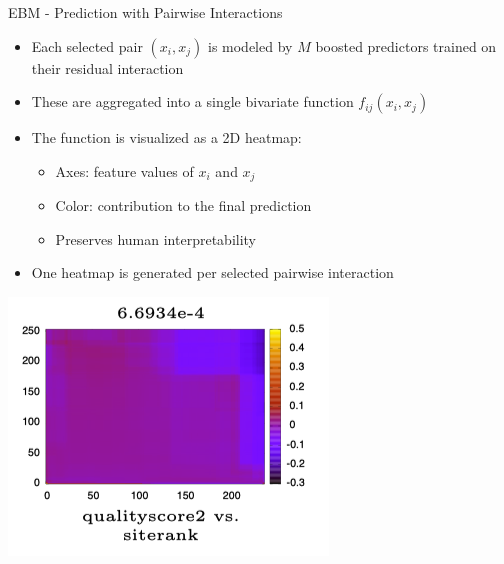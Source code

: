 \documentclass[11pt,compress,t,notes=noshow, aspectratio=169, xcolor=table]{beamer}
\begin{document}



\begin{frame}{EBM - Prediction with Pairwise Interactions}
\begin{itemize}
    \item Each selected pair $(x_i, x_j)$ is modeled by $M$ boosted predictors trained on their residual interaction
    \item These are aggregated into a single bivariate function $f_{ij}(x_i, x_j)$
    \item The function is visualized as a 2D heatmap: 
    \begin{itemize}
        \item Axes: feature values of $x_i$ and $x_j$
        \item Color: contribution to the final prediction
        \item Preserves human interpretability 
    \end{itemize}
    \item One heatmap is generated per selected pairwise interaction
\end{itemize}

\vspace{0.3cm}
\centering
\includegraphics[width=0.42\linewidth]{figure/3D Heatmap.png}
\end{frame}
\end{document}
